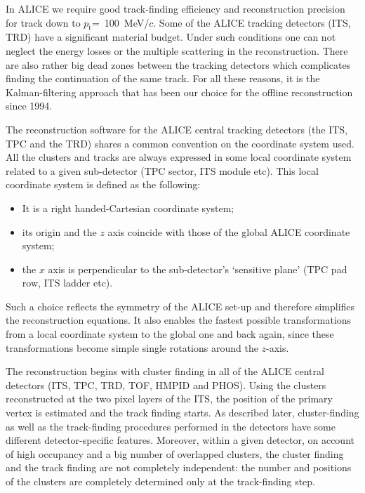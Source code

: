 \documentclass[12pt,a4paper,twoside]{article}
\newcommand{\pt}{\ensuremath{p_{\mathrm{t}}}}
\begin{document}
In ALICE we require good track-finding efficiency and reconstruction
precision for track down to \mbox{\pt = 100 MeV/$c$.} Some of the ALICE
tracking detectors (ITS, TRD) have a significant material budget.
Under such conditions one can not neglect the energy losses or the multiple 
scattering in the reconstruction.  There are also rather
big dead zones between the tracking detectors which complicates finding
the continuation of the same track. For all these reasons,
it is the Kalman-filtering approach that has been our choice for the
offline reconstruction since 1994.        


The reconstruction software for the ALICE central tracking detectors (the
ITS, TPC and the TRD)  shares a common convention on the coordinate 
system used. All the clusters and tracks are always expressed in some local
coordinate system related to a given sub-detector (TPC sector, ITS module
etc). This local coordinate system is defined as the following: 
\begin{itemize}
\item It is a right handed-Cartesian coordinate system; 
\item its origin and the $z$ axis coincide with those of the global
  ALICE coordinate system;
\item the $x$ axis is perpendicular to the sub-detector's `sensitive plane'
  (TPC pad row, ITS ladder etc).
\end{itemize}
Such a choice reflects the symmetry of the ALICE set-up
and therefore simplifies the reconstruction equations. 
It also enables the fastest possible transformations from 
a local coordinate system to the global one and back again,
since these transformations become simple single rotations around the
$z$-axis. 


The reconstruction begins with cluster finding in all of the ALICE central
detectors (ITS, TPC, TRD, TOF, HMPID and PHOS). Using the clusters
reconstructed at the two pixel layers of the ITS, the position of the
primary vertex is estimated and the track finding starts. As
described later, cluster-finding as well as the track-finding procedures
performed in the detectors have some different detector-specific features.
Moreover, within a given detector, on account of high occupancy and a big
number of overlapped clusters, the cluster finding and the track finding are
not completely independent:  the number and positions of the clusters are
completely determined only at the track-finding step.
\end{document}
